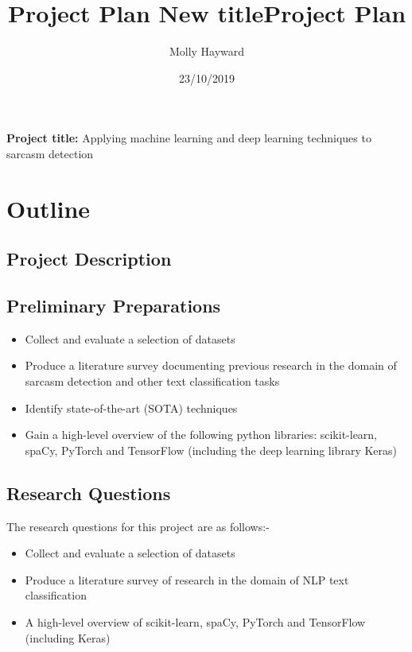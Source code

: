\documentclass[12pt,a4paper]{article}
\title{Project Plan \large \newline 
New title}
\title{Project Plan}
\author{Molly Hayward}
\date{23/10/2019}
\begin{document}
\maketitle

\begin{center}
	\textbf{Project title:} Applying machine learning and deep learning techniques to sarcasm detection
\end{center}


\section{Outline}
\subsection{Project Description}


\subsection{Preliminary Preparations}
\begin{itemize}
	\setlength\itemsep{0em}
	\item Collect and evaluate a selection of datasets
	\item Produce a literature survey documenting previous research in the domain of sarcasm detection and other text classification tasks
	\item Identify state-of-the-art (SOTA) techniques
	\item Gain a high-level overview of the following python libraries: scikit-learn, spaCy, PyTorch and TensorFlow (including the deep learning library Keras)
\end{itemize}



\subsection{Research Questions}
The research questions for this project are as follows:-
\begin{itemize}
	\setlength\itemsep{0em}
	\item Collect and evaluate a selection of datasets
	\item Produce a literature survey of research in the domain of NLP text classification
	\item A high-level overview of scikit-learn, spaCy, PyTorch and TensorFlow (including Keras)
\end{itemize}
\end{document}
